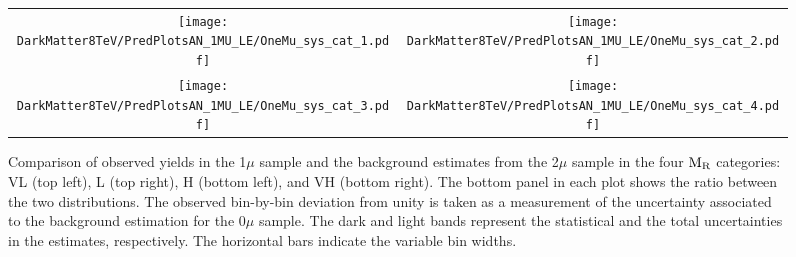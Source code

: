 {{\begin{figure}[h!]
 \centering
 \begin{tabular}{cc}
   \texttt{[image: DarkMatter8TeV/PredPlotsAN\_1MU\_LE/OneMu\_sys\_cat\_1.pdf]}  & 
   \texttt{[image: DarkMatter8TeV/PredPlotsAN\_1MU\_LE/OneMu\_sys\_cat\_2.pdf]}
   \\
   \texttt{[image: DarkMatter8TeV/PredPlotsAN\_1MU\_LE/OneMu\_sys\_cat\_3.pdf]}  & 
   \texttt{[image: DarkMatter8TeV/PredPlotsAN\_1MU\_LE/OneMu\_sys\_cat\_4.pdf]} \\
 \end{tabular}
 \caption{Comparison of observed yields in the 1$\mu$ sample and the
   background estimates from the 2$\mu$ sample in the four $\mathrm{M_{\rm R}}$ categories:
   VL (top left), L (top right), H (bottom left), and VH (bottom right). The bottom panel in each plot shows the
   ratio between the two distributions. The observed bin-by-bin
   deviation from unity is taken as a measurement of the uncertainty
   associated to the background estimation for the 0$\mu$ sample. The
   dark and light bands represent the statistical and the total
   uncertainties in the estimates, respectively. The horizontal bars indicate 
the variable bin widths.\label{fig:1muCLOSURE}}
\end{figure}

}}
